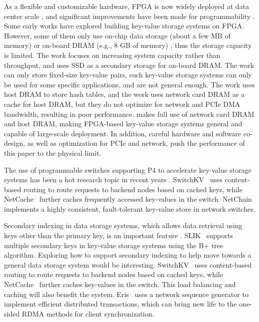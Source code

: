 As a flexible and customizable hardware, FPGA is now widely deployed at data center scale \cite{putnam2014reconfigurable,caulfield2016cloud}, and significant improvements have been made for programmability \cite{bacon2013fpga,li2016clicknp}. Some early works have explored building key-value storage systems on FPGA. However, some of them only use on-chip data storage (about a few MB of memory) \cite{liang16fpl} or on-board DRAM (e.g., 8 GB of memory) \cite{istvan2013flexible,chalamalasetti2013fpga,istvan2015hash}, thus the storage capacity is limited. The work \cite{blott2015scaling} focuses on increasing system capacity rather than throughput, and uses SSD as a secondary storage for on-board DRAM. The work \cite{liang16fpl,chalamalasetti2013fpga} can only store fixed-size key-value pairs, such key-value storage systems can only be used for some specific applications, and are not general enough. The work \cite{blott13hotcloud,lavasani2014fpga} uses host DRAM to store hash tables, and the work \cite{tokusashi2016multilevel} uses network card DRAM as a cache for host DRAM, but they do not optimize for network and PCIe DMA bandwidth, resulting in poor performance. \oursys{} makes full use of network card DRAM and host DRAM, making FPGA-based key-value storage systems general and capable of large-scale deployment. In addition, careful hardware and software co-design, as well as optimization for PCIe and network, push the performance of this paper to the physical limit.

The use of programmable switches supporting P4 \cite{bosshart2014p4} to accelerate key-value storage systems has been a hot research topic in recent years \cite{barefoot-tofino}. SwitchKV~\cite{li2016fast} uses content-based routing to route requests to backend nodes based on cached keys, while NetCache~\cite{netcache-sosp17} further caches frequently accessed key-values in the switch. NetChain~\cite{jin2018netchain} implements a highly consistent, fault-tolerant key-value store in network switches.

Secondary indexing in data storage systems, which allows data retrieval using keys other than the primary key, is an important feature \cite{escriva2012hyperdex,kejriwal2016slik}. SLIK~\cite{kejriwal2016slik} supports multiple secondary keys in key-value storage systems using the B+ tree algorithm. Exploring how to support secondary indexing to help \oursys{} move towards a general data storage system would be interesting. SwitchKV~\cite{li2016fast} uses content-based routing to route requests to backend nodes based on cached keys, while NetCache~\cite{netcache-sosp17} further caches key-values in the switch. This load balancing and caching will also benefit the system. Eris~\cite{eris} uses a network sequence generator to implement efficient distributed transactions, which can bring new life to the one-sided RDMA methods for client synchronization.

